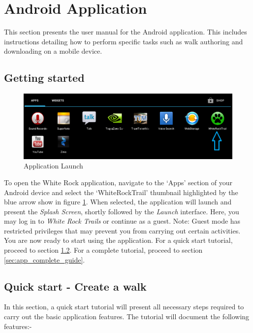 \documentclass[11pt,a4paper]{report}
\begin{document}
\section{Android Application}
\label{user_manual_application}

This section presents the user manual for the Android application. This includes instructions detailing how to perform specific tasks such as walk authoring and downloading on a mobile device.

\subsection{Getting started}

\begin{figure}[H]
\centering
\includegraphics[width=0.8\linewidth]{./img/chris/app_thumb}
\caption{Application Launch}
\label{fig:app_thumb}
\end{figure}

To open the White Rock application, navigate to the `Apps' section of your Android device and select the `WhiteRockTrail' thumbnail highlighted by the blue arrow show in figure \ref{fig:app_thumb}. When selected, the application will launch and present the \emph{Splash Screen}, shortly followed by the \emph{Launch} interface. Here, you may log in to \emph{White Rock Trails} or continue as a guest. Note: Guest mode has restricted privileges that may prevent you from carrying out certain activities.\\

You are now ready to start using the application. For a quick start tutorial, proceed to section \ref{sec:app_quick_start}. For a complete tutorial, proceed to section \ref{sec:app_complete_guide}. 

\subsection{Quick start - Create a walk}
\label{sec:app_quick_start}
In this section, a quick start tutorial will present all necessary steps required to carry out the basic application features. The tutorial will document the following features:-
\end{document}
